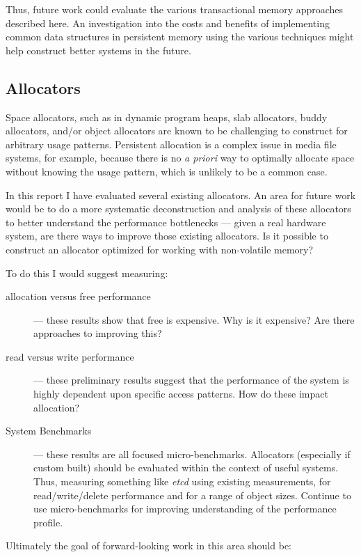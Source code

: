 Thus, future work could evaluate the various transactional memory approaches described here.  An investigation into the costs and benefits of implementing common data structures in persistent memory using the various techniques might help construct better systems in the future.

\subsection{Allocators}\label{discussion:allocators}

Space allocators, such as in dynamic program heaps, slab allocators, buddy allocators, and/or object allocators are known to be challenging to construct for arbitrary usage patterns.  Persistent allocation is a complex issue in media file systems, for example, because there is no \textit{a priori} way to optimally allocate space without knowing the usage pattern, which is unlikely to be a common case.

In this report I have evaluated several existing allocators.  An area for future work would be to do a more systematic deconstruction and analysis of these allocators to better understand the performance bottlenecks --- given a real hardware system, are there ways to improve those existing allocators.  Is it possible to construct an allocator optimized for working with
non-volatile memory?

To do this I would suggest measuring:

\begin{description}
    \item[allocation versus free performance] --- these results show that free is expensive.  Why is it expensive?  Are there approaches to improving this?
    \item[read versus write performance] --- these preliminary results suggest that the performance of the system is highly dependent upon specific access patterns.  How do these impact allocation?
    \item[System Benchmarks] --- these results are all focused micro-benchmarks.  Allocators (especially if custom built) should be evaluated within the context of useful systems. Thus, measuring something like \textit{etcd} using existing measurements, for read/write/delete performance and for a range of object sizes.  Continue to use micro-benchmarks for improving understanding of the performance profile.  
\end{description}

Ultimately the goal of forward-looking work in this area should be:

